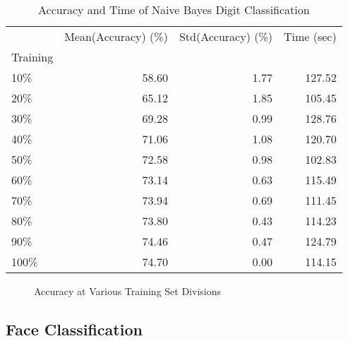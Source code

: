 \documentclass[10pt,parskip=half,
toc=sectionentrywithdots,
bibliography=totocnumbered,
captions=tableheading,numbers=noendperiod]{scrartcl}
\begin{document}
\begin{table}[H]
\caption{Accuracy and Time of Naive Bayes Digit Classification}\label{tbl:tlabel}
\centering
\begin{adjustbox}{max width=\textwidth}
\begin{tabular}{lrrr}
\toprule
{} &  Mean(Accuracy) (\%) &  Std(Accuracy) (\%) &  Time (sec) \\
Training &                     &                    &             \\
\midrule
10\%      &               58.60 &               1.77 &      127.52 \\
20\%      &               65.12 &               1.85 &      105.45 \\
30\%      &               69.28 &               0.99 &      128.76 \\
40\%      &               71.06 &               1.08 &      120.70 \\
50\%      &               72.58 &               0.98 &      102.83 \\
60\%      &               73.14 &               0.63 &      115.49 \\
70\%      &               73.94 &               0.69 &      111.45 \\
80\%      &               73.80 &               0.43 &      114.23 \\
90\%      &               74.46 &               0.47 &      124.79 \\
100\%     &               74.70 &               0.00 &      114.15 \\
\bottomrule
\end{tabular}

\end{adjustbox}
\end{table}

\begin{figure}[H]\begin{center}\end{center}\caption{Accuracy at Various Training Set Divisions}\label{fig:flabel}\end{figure}

\hypertarget{face-classification}{%
\subsection{Face Classification}\label{face-classification}}
\end{document}
